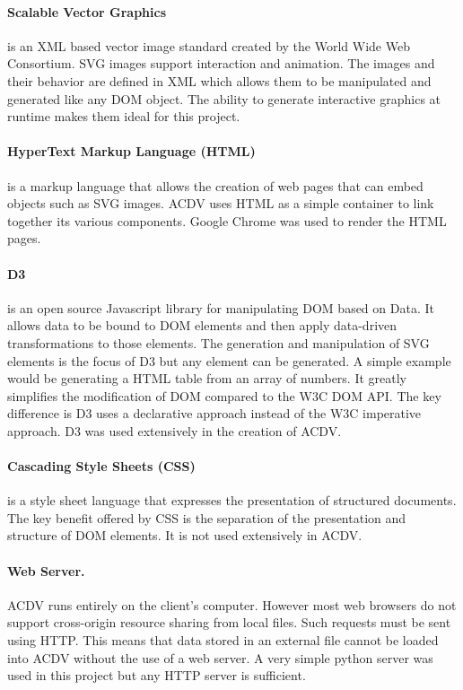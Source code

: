 \documentclass[a4paper, 11pt, titlepage, onehalfspacing]{report}
\begin{document}
\paragraph{Scalable Vector Graphics}is an XML based vector image standard created by the World Wide Web Consortium. SVG images support interaction and animation. The images and their behavior are defined in XML which allows them to be manipulated and generated like any DOM object. The ability to generate interactive graphics at runtime makes them ideal for this project.

\paragraph{HyperText Markup Language (HTML)}is a markup language that allows the creation of web pages that can embed objects such as SVG images. AC\lightning{}DV uses HTML as a simple container to link together its various components. Google Chrome was used to render the HTML pages.

\paragraph{D3}is an open source Javascript library for manipulating DOM based on Data. It allows data to be bound to DOM elements and then apply data-driven transformations to those elements. The generation and manipulation of SVG elements is the focus of D3 but any element can be generated. A simple example would be generating a HTML table from an array of numbers. It greatly simplifies the modification of DOM compared to the W3C DOM API. The key difference is D3 uses a declarative approach instead of the W3C imperative approach. D3 was used extensively in the creation of AC\lightning{}DV.

\paragraph{Cascading Style Sheets (CSS)}is a style sheet language that expresses the presentation of structured documents. The key benefit offered by CSS is the separation of the presentation and structure of DOM elements. It is not used extensively in AC\lightning{}DV.

\paragraph{Web Server.} AC\lightning{}DV runs entirely on the client's computer. However most web browsers do not support cross-origin resource sharing from local files. Such requests must be sent using HTTP. This means that data stored in an external file cannot be loaded into AC\lightning{}DV without the use of a web server. A very simple python server was used in this project but any HTTP server is sufficient. 
\end{document}
